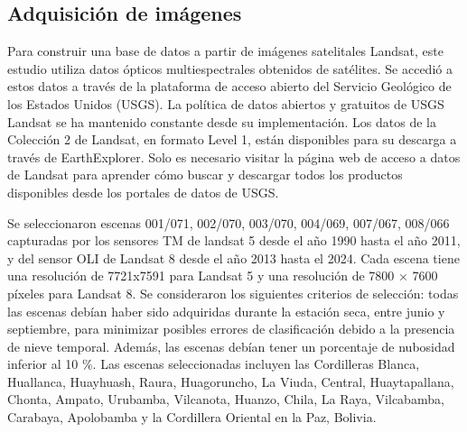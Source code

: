  



\subsection{Adquisición de imágenes}
Para construir una base de datos a partir de imágenes satelitales Landsat, este estudio utiliza datos ópticos multiespectrales obtenidos de satélites. Se accedió a estos datos a través de la plataforma de acceso abierto del Servicio Geológico de los Estados Unidos (USGS). La política de datos abiertos y gratuitos de USGS Landsat se ha mantenido constante desde su implementación. Los datos de la Colección 2 de Landsat, en formato Level 1, están disponibles para su descarga a través de EarthExplorer. Solo es necesario visitar la página web de acceso a datos de Landsat para aprender cómo buscar y descargar todos los productos disponibles desde los portales de datos de USGS.


Se seleccionaron escenas 001/071, 002/070, 003/070, 004/069, 007/067, 008/066 capturadas por los sensores TM de landsat 5 desde el año 1990 hasta el año 2011, y del sensor OLI de Landsat 8 desde el año 2013 hasta el 2024. Cada escena tiene una resolución de 7721x7591 para Landsat 5 y una resolución de 7800 × 7600 píxeles para Landsat 8. Se consideraron los siguientes criterios de selección: todas las escenas debían haber sido adquiridas durante la estación seca, entre junio y septiembre, para minimizar posibles errores de clasificación debido a la presencia de nieve temporal. Además, las escenas debían tener un porcentaje de nubosidad inferior al 10 \%. Las escenas seleccionadas incluyen las Cordilleras Blanca, Huallanca, Huayhuash, Raura, Huagoruncho, La Viuda, Central, Huaytapallana, Chonta, Ampato, Urubamba, Vilcanota, Huanzo, Chila, La Raya, Vilcabamba, Carabaya, Apolobamba y la Cordillera Oriental en la Paz, Bolivia. 



